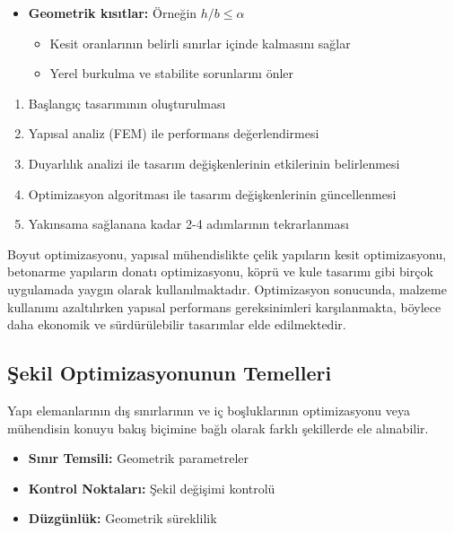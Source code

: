 \begin{itemize}
    \item \textbf{Geometrik kısıtlar:} Örneğin $h/b \leq \alpha$
    \begin{itemize}
        \item Kesit oranlarının belirli sınırlar içinde kalmasını sağlar
        \item Yerel burkulma ve stabilite sorunlarını önler
    \end{itemize}
\end{itemize}

\begin{tcolorbox}[title=Boyut Optimizasyonu Süreci]
\begin{enumerate}
    \item Başlangıç tasarımının oluşturulması
    \item Yapısal analiz (FEM) ile performans değerlendirmesi
    \item Duyarlılık analizi ile tasarım değişkenlerinin etkilerinin belirlenmesi
    \item Optimizasyon algoritması ile tasarım değişkenlerinin güncellenmesi
    \item Yakınsama sağlanana kadar 2-4 adımlarının tekrarlanması
\end{enumerate}
\end{tcolorbox}

Boyut optimizasyonu, yapısal mühendislikte çelik yapıların kesit optimizasyonu, betonarme yapıların donatı optimizasyonu, köprü ve kule tasarımı gibi birçok uygulamada yaygın olarak kullanılmaktadır. Optimizasyon sonucunda, malzeme kullanımı azaltılırken yapısal performans gereksinimleri karşılanmakta, böylece daha ekonomik ve sürdürülebilir tasarımlar elde edilmektedir.


\subsection{Şekil Optimizasyonunun Temelleri}
Yapı elemanlarının dış sınırlarının ve iç boşluklarının optimizasyonu veya mühendisin konuyu bakış biçimine bağlı olarak farklı şekillerde ele alınabilir.

\begin{itemize}
    \item \textbf{Sınır Temsili:} Geometrik parametreler
    \item \textbf{Kontrol Noktaları:} Şekil değişimi kontrolü
    \item \textbf{Düzgünlük:} Geometrik süreklilik
\end{itemize}


